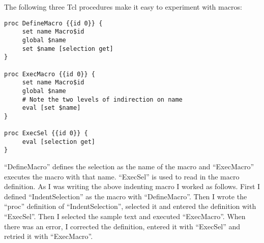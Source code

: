 The following three Tcl procedures make it easy to
experiment with macros:
\begin{verbatim}
proc DefineMacro {{id 0}} {
     set name Macro$id
     global $name
     set $name [selection get]
}

proc ExecMacro {{id 0}} {
     set name Macro$id
     global $name
     # Note the two levels of indirection on name
     eval [set $name]
}

proc ExecSel {{id 0}} {
     eval [selection get]
}
\end{verbatim}
``DefineMacro'' defines the selection as the name of the macro
and ``ExecMacro'' executes the macro with that name.
``ExecSel'' is used to read in the macro definition.
As I was writing the above indenting macro I worked as follows.
First I defined ``IndentSelection'' as the macro with ``DefineMacro''.
Then I wrote the ``proc'' definition of ``IndentSelection'', selected
it and entered the definition with ``ExecSel''.
Then I selected the sample text and executed ``ExecMacro''.
When there was an error, I corrected the definition,
entered it with ``ExecSel'' and retried it with ``ExecMacro''.









